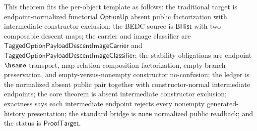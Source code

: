\begin{theorem}
\label{thm:tagged-option-composite-image-classifier-normalized-absent-intermediate-constructor-exclusion}
This theorem fits the per-object template as follows: the traditional target is
endpoint-normalized functorial $\mathsf{OptionUp}$ absent public factorization
with intermediate constructor exclusion; the BEDC source is
$\mathsf{BHist}$ with two composable descent maps; the carrier and image
classifier are $\mathsf{TaggedOptionPayloadDescentImageCarrier}$ and
$\mathsf{TaggedOptionPayloadDescentImageClassifier}$; the stability obligations
are endpoint $\hsame$ transport, map-relation composition factorization,
empty-branch preservation, and empty-versus-nonempty constructor no-confusion;
the ledger is the normalized absent public pair together with constructor-normal
intermediate endpoints; the core theorem is absent intermediate constructor
exclusion; exactness says each intermediate endpoint rejects every nonempty
generated-history presentation; the standard bridge is $\mathsf{none}$
normalized public readback; and the status is $\mathsf{ProofTarget}$.


\end{theorem}
